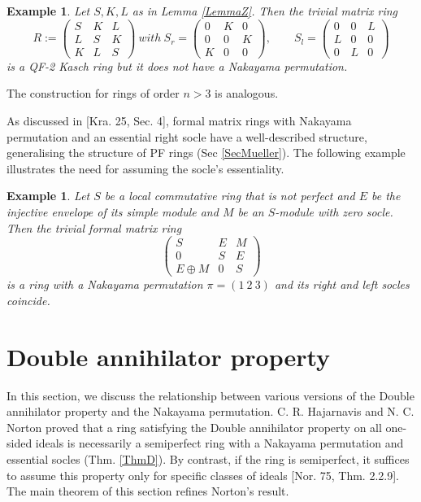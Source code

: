 \documentclass[11pt]{article}
\theoremstyle{plain}
\newtheorem{Ex}[veta]{Example}
\theoremstyle{remark}
\theoremstyle{plain}
\begin{document}
\begin{Ex}\label{ExQFKasch2}
    Let $S, K, L$ as in Lemma \ref{LemmaZ}. Then the trivial matrix ring \[R:=\begin{pmatrix}
        S & K & L\\
        L& S& K\\
        K & L &S
    \end{pmatrix}~with~
        S_r=\begin{pmatrix}
         0 & K & 0\\
        0& 0& K\\
        K & 0 &0
    \end{pmatrix}, \qquad S_l=\begin{pmatrix}
        0 & 0 & L\\
        L& 0& 0\\
        0 & L &0
    \end{pmatrix}\]
  is a QF-2 Kasch ring but it does not have a Nakayama permutation.
\end{Ex}The construction for rings of order $n>3$ is analogous.

As discussed in [Kra. 25, Sec. 4], formal matrix rings with Nakayama permutation and an essential right socle have a well-described structure, generalising the structure of PF rings (Sec \ref{SecMueller}). The following example illustrates the need for assuming the socle's essentiality.
\begin{Ex}\label{ExnotEss}
    Let $S$ be a local commutative ring that is not perfect and $E$ be the injective envelope of its simple module and $M$ be an $S$-module with zero socle.     Then the trivial formal matrix ring \[\begin{pmatrix}
        S&E&M\\
        0&S&E\\
        E\oplus M&0&S
    \end{pmatrix} \]   is a ring with a Nakayama permutation $\pi=(1~2~3)$ and its right and left socles coincide.
\end{Ex}


\section{Double annihilator property}\label{SecDouble}


In this section, we discuss the relationship between various versions of the Double annihilator property and the Nakayama permutation. C. R. Hajarnavis and  N. C. Norton proved that a ring satisfying the Double annihilator property on all one-sided ideals is necessarily a semiperfect ring with a Nakayama permutation and essential socles (Thm. \ref{ThmD}). By contrast, if the ring is semiperfect, it suffices to assume this property only for specific classes of ideals [Nor. 75, Thm. 2.2.9]. The main theorem of this section refines Norton's result. 
\end{document}
